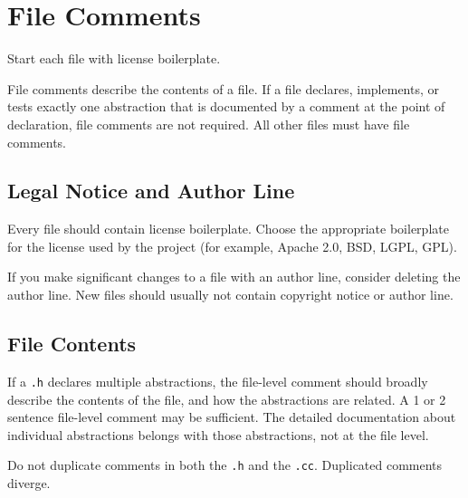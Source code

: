 
\section{File Comments}\label{sec:file-comments}
Start each file with license boilerplate.

File comments describe the contents of a file. If a file declares, implements, or tests exactly one abstraction that is documented by a comment at the point of declaration, file comments are not required. All other files must have file comments.

    \subsection{Legal Notice and Author Line}
    Every file should contain license boilerplate. Choose the appropriate boilerplate for the license used by the project (for example, Apache 2.0, BSD, LGPL, GPL).

    If you make significant changes to a file with an author line, consider deleting the author line. New files should usually not contain copyright notice or author line.
    \subsection{File Contents}
    If a \texttt{.h} declares multiple abstractions, the file-level comment should broadly describe the contents of the file, and how the abstractions are related. A 1 or 2 sentence file-level comment may be sufficient. The detailed documentation about individual abstractions belongs with those abstractions, not at the file level.

    Do not duplicate comments in both the \texttt{.h} and the \texttt{.cc}. Duplicated comments diverge.
